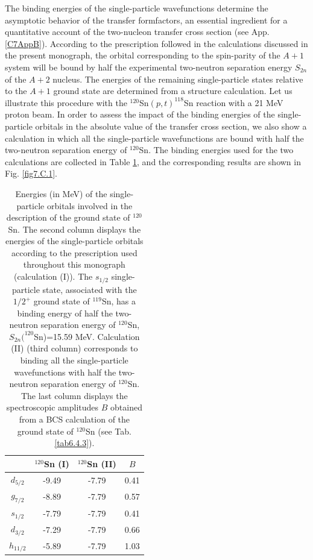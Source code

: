\begin{subappendices}
The binding energies of the single-particle wavefunctions  determine the asymptotic behavior of the transfer formfactors, an essential ingredient for a quantitative account of the two-nucleon transfer cross section (see App. \ref{C7AppB}). According to the prescription followed in the calculations discussed in the present monograph, the  orbital corresponding to the spin-parity of the  $A+1$ system will be  bound by half the experimental two-neutron separation energy $S_{2n}$   of the  $A+2$ nucleus.  The energies of the remaining single-particle states relative to the $A+1$ ground state are determined from a structure calculation. Let us illustrate this procedure with the $^{120}$Sn$(p,t)^{118}$Sn reaction with a 21 MeV proton beam. In order to assess the impact of the binding energies of the single-particle orbitals in the absolute value of the transfer cross section, we also show a calculation in which all the single-particle wavefunctions are bound with half the two-neutron separation energy of $^{120}$Sn. The binding energies used for the two calculations are collected in Table \ref{Tab7.C.1}, and the corresponding results are shown in Fig. \ref{fig7.C.1}.
\begin{table}
	\begin{center}
	\begin{tabular}{|c|c|c|c|} 
		\hline
		& $^{120}$Sn (I) & $^{120}$Sn (II) & $B$ \\
		\hline
	$d_{5/2}$	&  -9.49 &-7.79&0.41\\
	\hline
	$g_{7/2}$	&  -8.89&-7.79&0.57\\
	\hline
	$s_{1/2}$	&  -7.79&-7.79&0.41\\
	\hline
	$d_{3/2}$	&  -7.29&-7.79&0.66\\
	\hline
	$h_{11/2}$	& -5.89 &-7.79&1.03\\
	\hline
	\end{tabular}
\end{center}
	\caption{Energies (in MeV) of the single-particle orbitals involved in the description of the ground state of $^{120}$Sn. The second column displays the energies of the single-particle orbitals according to the prescription used throughout this monograph (calculation (I)). The $s_{1/2}$ single-particle state, associated with the $1/2^+$ ground state of $^{119}$Sn, has a binding energy of half the two-neutron separation energy of $^{120}$Sn, $S_{2n}(^{120}$Sn)=15.59 MeV. Calculation (II) (third column) corresponds to binding all the single-particle wavefunctions with half the two-neutron separation energy of $^{120}$Sn. The last column displays the spectroscopic amplitudes $B$ obtained from a BCS calculation of the ground state of $^{120}$Sn (see Tab. \ref{tab6.4.3}).}\label{Tab7.C.1}

\end{table}
\end{subappendices}
